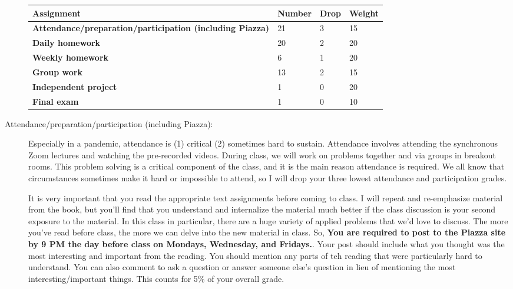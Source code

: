 \documentclass[12pt]{article}
\begin{document}
\begin{description}
\setlength{\arrayrulewidth}{1mm}
\setlength{\tabcolsep}{8pt}
{
\begin{table}[]
\label{tab:my-table}
\begin{tabular}{llll}
\hline
\textbf{Assignment}                                              & \textbf{Number} & \textbf{Drop} & \textbf{Weight} \\ \hline
\textbf{Attendance/preparation/participation (including Piazza)} & 21     & 3    & 15     \\
\textbf{Daily homework }                                         & 20     & 2    & 20     \\
\textbf{Weekly homework }                                        & 6      & 1    & 20     \\
\textbf{Group work }                                             & 13     & 2    & 15     \\
\textbf{Independent project }                                    & 1      & 0    & 20     \\
\textbf{Final exam }                                              & 1      & 0    & 10     \\ \hline
\end{tabular}
\end{table}
}

  
\item[Attendance/preparation/participation (including Piazza):] Especially in a pandemic, attendance is (1) critical (2) sometimes hard to sustain. Attendance involves attending the synchronous Zoom lectures and watching the pre-recorded videos. During class, we will work on problems together and via groups in breakout rooms. This problem solving is a critical component of the class, and it is the main reason attendance is required. We all know that circumstances sometimes make it hard or impossible to attend, so I will drop your three lowest attendance and participation grades.

  It is very important that you read the appropriate text assignments before coming to class. I will repeat and re-emphasize material from the book, but you'll find that you understand and internalize the material much better if the class discussion is your second exposure to the material. In this class in particular, there are a huge variety of applied problems that we'd love to discuss. The more you've read before class, the more we can delve into the new material in class. So, \textbf{You are required to post to the Piazza site by 9 PM the day before class on Mondays, Wednesday, and Fridays.}. Your post should include what you thought was the most interesting and important from the reading. You should mention any parts of teh reading that were particularly hard to understand. You can also comment to ask a question or answer someone else's question in lieu of mentioning the most interesting/important things. This counts for 5\% of your overall grade.


\end{description}
\end{document}
